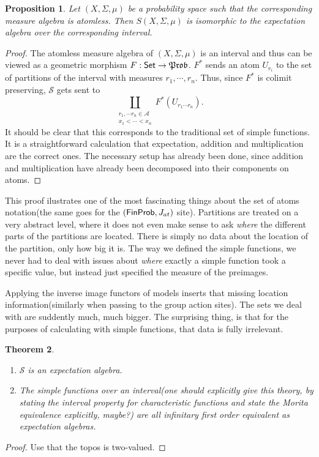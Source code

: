 \documentclass[a4paper]{amsproc}
\theoremstyle{plain}
\newtheorem{theorem}{Theorem}[section]
\newtheorem{proposition}[theorem]{Proposition}
\theoremstyle{definition}
\theoremstyle{remark}
\numberwithin{equation}{section}
\newcommand{\Set}{\textup{\textsf{Set}}}
\newcommand{\FinProb}{\textup{\textsf{FinProb}}}
\newcommand{\Prob}{\mathfrak{Prob}}
\begin{document}
\begin{proposition}
    Let $(X, \Sigma, \mu)$ be a probability space such that the corresponding measure algebra is atomless. Then $S(X,\Sigma,\mu)$ is isomorphic to the expectation algebra over the corresponding interval.
\end{proposition}
\begin{proof}
    The atomless measure algebra of $(X, \Sigma, \mu)$ is an interval and thus can be viewed as a geometric morphism $F: \Set \to \Prob$. $F^*$ sends an atom $U_{r_i}$ to the set of partitions of the interval with measures $r_1,\cdots,r_n$. Thus, since $F^*$ is colimit preserving, $\mathcal{S}$ gets sent to
    \[
        \coprod_{\substack{r_1, \cdots r_n \in \mathcal{A} \\ x_1 < \cdots < x_n}} F^*(U_{r_1\cdots r_n}) .
    \]
    It should be clear that this corresponds to the traditional set of simple functions. It is a straightforward calculation that expectation, addition and multiplication are the correct ones. The necessary setup has already been done, since addition and multiplication have already been decomposed into their components on atoms.
\end{proof}

This proof ilustrates one of the most fascinating things about the set of atoms notation(the same goes for the $(\FinProb, J_{at})$ site). Partitions are treated on a very abstract level, where it does not even make sense to ask \emph{where} the different parts of the partitions are located. There is simply no data about the location of the partition, only how big it is. The way we defined the simple functions, we never had to deal with issues about \emph{where} exactly a simple function took a specific value, but instead just specified the measure of the preimages.

Applying the inverse image functors of models inserts that missing location information(similarly when passing to the group action sites). The sets we deal with are suddently much, much bigger. The surprising thing, is that for the purposes of calculating with simple functions, that data is fully irrelevant.

\begin{theorem}
    \begin{enumerate}
    \item $\mathcal{S}$ is an expectation algebra.
    \item The simple functions over an interval(one should explicitly give this theory, by stating the interval property for characteristic functions and state the Morita equivalence explicitly, maybe?) are all infinitary first order equivalent as expectation algebras.
    \end{enumerate}
\end{theorem}
\begin{proof}
    Use that the topos is two-valued.
\end{proof}
\end{document}
